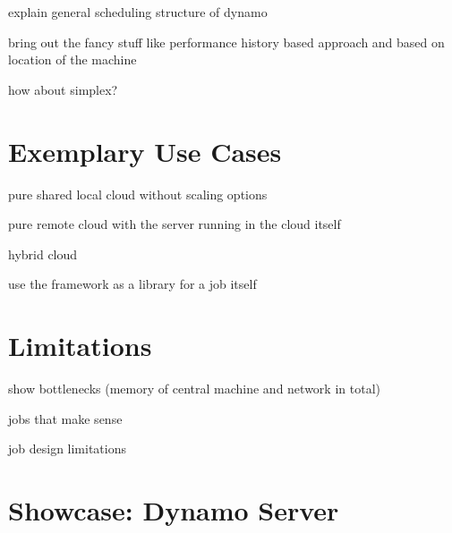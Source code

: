 explain general scheduling structure of dynamo

bring out the fancy stuff like performance history based approach and based on location of the machine

how about simplex?

\section{Exemplary Use Cases}

pure shared local cloud without scaling options

pure remote cloud with the server running in the cloud itself

hybrid cloud

use the framework as a library for a job itself

\section{Limitations}

show bottlenecks (memory of central machine and network in total)

jobs that make sense

job design limitations

\section{Showcase: Dynamo Server}
